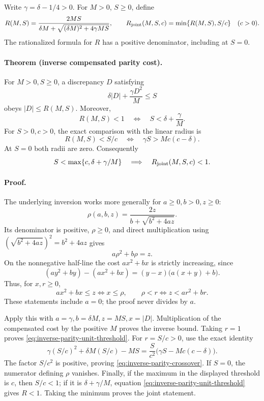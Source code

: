 Write \(\gamma=\delta-1/4>0\).  For \(M>0\), \(S\ge0\), define
\[
 R(M,S)=
 \frac{2MS}{\delta M+\sqrt{(\delta M)^2+4\gamma MS}},
 \qquad
 R_{\rm joint}(M,S,c)=\min\{R(M,S),S/c\}\quad(c>0).
\]
The rationalized formula for \(R\) has a positive denominator,
including at \(S=0\).

\paragraph{Theorem (inverse compensated parity cost).}
For \(M>0,S\ge0\), a discrepancy \(D\) satisfying
\[
 \delta|D|+\frac{\gamma D^2}{M}\le S
\]
obeys \(|D|\le R(M,S)\).  Moreover,
\begin{equation}
 R(M,S)<1
 \quad\Longleftrightarrow\quad
 S<\delta+\frac{\gamma}{M}.
 \label{eq:inverse-parity-unit-threshold}
\end{equation}
For \(S>0,c>0\), the exact comparison with the linear radius is
\begin{equation}
 R(M,S)<S/c
 \quad\Longleftrightarrow\quad
 \gamma S>Mc(c-\delta).
 \label{eq:inverse-parity-crossover}
\end{equation}
At \(S=0\) both radii are zero.
Consequently
\[
 S<\max\{c,\delta+\gamma/M\}
 \quad\Longrightarrow\quad R_{\rm joint}(M,S,c)<1.
\]

\paragraph{Proof.}
The underlying inversion works more generally for \(a\ge0,b>0,z\ge0\):
\[
 \rho(a,b,z)=\frac{2z}{b+\sqrt{b^2+4az}}.
\]
Its denominator is positive, \(\rho\ge0\), and direct multiplication
using \((\sqrt{b^2+4az})^2=b^2+4az\) gives
\[
 a\rho^2+b\rho=z.
\]
On the nonnegative half-line the cost \(ax^2+bx\) is strictly
increasing, since
\[
 (ay^2+by)-(ax^2+bx)=(y-x)\bigl(a(x+y)+b\bigr).
\]
Thus, for \(x,r\ge0\),
\[
 ax^2+bx\le z\iff x\le\rho,\qquad
 \rho<r\iff z<ar^2+br.
\]
These statements include \(a=0\); the proof never divides by \(a\).

Apply this with \(a=\gamma,b=\delta M,z=MS,x=|D|\).
Multiplication of the compensated cost by the positive \(M\)
proves the inverse bound.  Taking \(r=1\) proves
\eqref{eq:inverse-parity-unit-threshold}.
For \(r=S/c>0\), use the exact identity
\[
 \gamma(S/c)^2+\delta M(S/c)-MS
 =\frac{S}{c^2}\bigl(\gamma S-Mc(c-\delta)\bigr).
\]
The factor \(S/c^2\) is positive, proving
\eqref{eq:inverse-parity-crossover}.
If \(S=0\), the numerator defining \(\rho\) vanishes.
Finally, if the maximum in the displayed threshold is \(c\),
then \(S/c<1\); if it is \(\delta+\gamma/M\), equation
\eqref{eq:inverse-parity-unit-threshold} gives \(R<1\).
Taking the minimum proves the joint statement.

